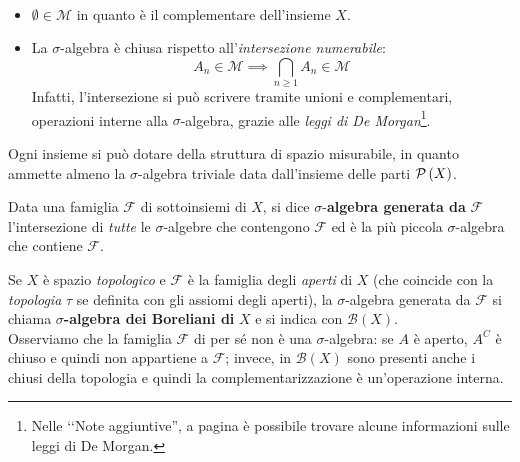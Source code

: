 \begin{observe}~{}
	\begin{itemize}
		\item $\emptyset\in\mathcal{M}$ in quanto è il complementare dell'insieme $X$.
		\item La $\sigma$-algebra è chiusa rispetto all'\textit{intersezione numerabile}:
		\begin{equation*}
			A_n\in\mathcal{M}\implies \bigcap_{n\geq 1}A_n\in\mathcal{M} 
		\end{equation*}
		Infatti, l'intersezione si può scrivere tramite unioni e complementari, operazioni interne alla $\sigma$-algebra, grazie alle \textit{leggi di De Morgan}\footnote{Nelle ‘‘Note aggiuntive'', a pagina \pageref{leggidemorgan} è possibile trovare alcune informazioni sulle leggi di De Morgan.}.
	\end{itemize}
\end{observe}
\begin{example}
	Ogni insieme si può dotare della struttura di spazio misurabile, in quanto ammette almeno la $\sigma$-algebra triviale data dall'insieme delle parti $\mathcal{P}\left(X\right)$.
\end{example}
\begin{define}
	Data una famiglia $\mathcal{F}$ di sottoinsiemi di $X$, si dice $\sigma$-\textbf{algebra generata da} $\mathcal{F}$ l'intersezione di \textit{tutte} le $\sigma$-algebre che contengono $\mathcal{F}$ ed è la più piccola $\sigma$-algebra che contiene $\mathcal{F}$.
\end{define}
\begin{example}
	Se $X$ è spazio \textit{topologico} e $\mathcal{F}$ è la famiglia degli \textit{aperti} di $X$ (che coincide con la \textit{topologia} $\tau$ se definita con gli assiomi degli aperti), la $\sigma$-algebra generata da $\mathcal{F}$ si chiama $\sigma$\textbf{-algebra dei Boreliani di} $X$ e si indica con $\mathcal{B}(X)$.\\
	Osserviamo che la famiglia $\mathcal{F}$ di per sé non è una $\sigma$-algebra: se $A$ è aperto, $A^C$ è chiuso e quindi non appartiene a $\mathcal{F}$; invece, in $\mathcal{B}(X)$ sono presenti anche i chiusi della topologia e quindi la complementarizzazione è un'operazione interna.
\end{example}
